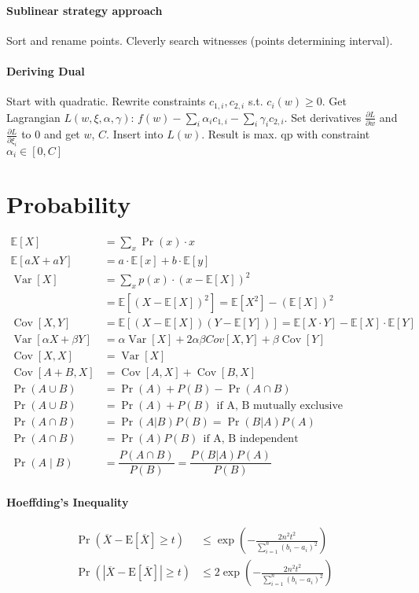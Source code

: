 \documentclass[11pt]{scrartcl}
\DeclareMathOperator{\Var}{Var}
\DeclareMathOperator{\Cov}{Cov}
\newcommand{\E}{\mathbb{E}}
\begin{document}
\begin{multicols}{3}
\paragraph{Sublinear strategy approach} Sort and rename points. Cleverly search witnesses (points determining interval).

\paragraph{Deriving Dual} Start with quadratic. Rewrite constraints $c_{1,i},c_{2,i}$ s.t. $c_i(w)\geq0$. Get Lagrangian $L(w,\xi,\alpha,\gamma )$: $f(w) - \sum_i{\alpha_ic_{1,i}} - \sum_i{\gamma_ic_{2,i}}$. Set derivatives $\frac{\partial L}{\partial w}$ and $\frac{\partial L}{\partial \xi_i}$ to $0$ and get $w$, $C$. Insert into $L(w)$. Result is max. qp with constraint $\alpha_i \in [0,C]$

\section{Probability}
\begin{align*}
	\E[X] & = \sum_x \Pr(x) \cdot x \\
	\E[aX + aY] & = a\cdot\E[x]+b\cdot\E[y] \\
	\Var[X] & = \sum_x p(x)\cdot(x-\E[X])^2 \\
	        & = \E[(X-\E[X])^2] = \E[X^2] - (\E[X])^2 \\
	\Cov[X,Y] & = \E[(X-\E[X])(Y-\E[Y])] = \E[X\cdot Y] - \E[X]\cdot\E[Y] \\
	\Var[\alpha X + \beta Y] & = \alpha \Var[X] + 2\alpha\beta Cov[X,Y] + \beta \Cov[Y] \\
	\Cov[X,X] & = \Var[X] \\
	\Cov[A+B, X] & = \Cov[A, X] + \Cov[B, X] \\
	\Pr(A\cup B) & = \Pr(A)+P(B) - \Pr(A\cap B) \\
	\Pr(A\cup B) & = \Pr(A)+P(B)\ \ \mbox{if A, B mutually exclusive} \\
	\Pr(A\cap B) & = \Pr(A|B)P(B) = \Pr(B|A)P(A)\\
	\Pr(A\cap B) & = \Pr(A)P(B)\ \ \mbox{if A, B independent}\\
	\Pr(A \mid B) & = \dfrac{P(A \cap B)}{P(B)} = \dfrac{P(B|A)P(A)}{P(B)}
\end{align*}

\paragraph{Hoeffding's Inequality}
\begin{align*}
\Pr \left(\overline X - \mathrm{E}\left [\overline X \right] \geq t \right) &\leq \exp \left(-\frac{2n^2t^2}{\sum_{i=1}^n (b_i - a_i)^2} \right) \\
\Pr \left(\left |\overline X - \mathrm{E}\left [\overline X \right] \right | \geq t \right) &\leq 2\exp \left(-\frac{2n^2t^2}{\sum_{i=1}^n(b_i - a_i)^2} \right)
\end{align*}

\end{multicols}
\end{document}
